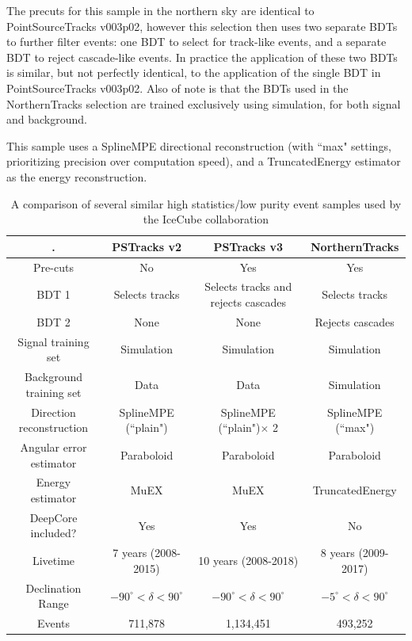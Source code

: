 The precuts for this sample in the northern sky are identical to PointSourceTracks v003p02, however this selection then uses two separate BDTs to further filter events: one BDT to select for track-like events, and a separate BDT to reject cascade-like events. In practice the application of these two BDTs is similar, but not perfectly identical, to the application of the single BDT in PointSourceTracks v003p02. Also of note is that the BDTs used in the NorthernTracks selection are trained exclusively using simulation, for both signal and background.

This sample uses a SplineMPE directional reconstruction (with ``max" settings, prioritizing precision over computation speed), and a TruncatedEnergy estimator as the energy reconstruction. 


\begin{table}
\centering
\begin{tabular*}{0.853\textwidth}{|c|ccc|} 
\hline
. & PSTracks v2 & PSTracks v3 & NorthernTracks\\
\hline\hline
Pre-cuts & No & Yes & Yes\\ 
BDT 1 & Selects tracks & Selects tracks and rejects cascades & Selects tracks \\
BDT 2 & None & None & Rejects cascades \\
Signal training set & Simulation & Simulation & Simulation \\
Background training set & Data & Data & Simulation \\
Direction reconstruction & SplineMPE (``plain") & SplineMPE (``plain")$\times$ 2 & SplineMPE (``max") \\
Angular error estimator & Paraboloid & Paraboloid & Paraboloid \\
Energy estimator & MuEX & MuEX & TruncatedEnergy \\ 
DeepCore included? & Yes & Yes & No \\
Livetime & 7 years (2008-2015) & 10 years (2008-2018) & 8 years (2009-2017) \\
Declination Range & $-90^{\circ}<\delta<90^{\circ}$ & $-90^{\circ}<\delta<90^{\circ}$ & $-5^{\circ}<\delta<90^{\circ}$ \\
Events & 711,878 & 1,134,451 & 493,252 \\
\hline
\end{tabular*}
\label{tab:evtsamples}
\caption{A comparison of several similar high statistics/low purity event samples used by the IceCube collaboration}
\end{table}

